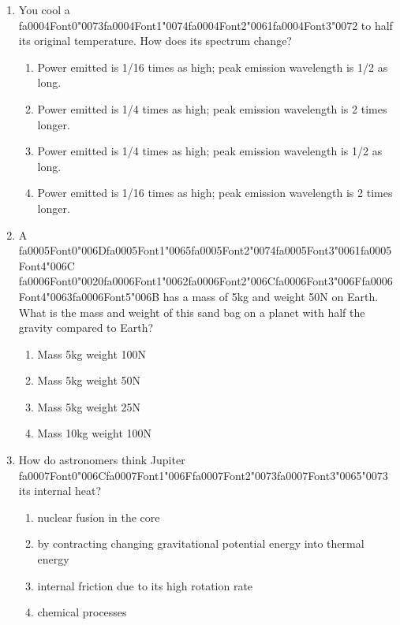 \documentclass[12pt]{article}
\begin{document}
\begin{enumerate}[label=\arabic*.]
\begin{enumerate}[label=(\alph*)]
    \item 2:3 periodic ratio of Neptune:Pluto
    \item Kirkwood Gaps.
    \item Gaps in Saturn's rings.
    \item Breaking of small Jovian moons to form ring materials.
\end{enumerate}
\item You cool a {\csname fa0004Font0\endcsname\char"0073}{\csname fa0004Font1\endcsname\char"0074}{\csname fa0004Font2\endcsname\char"0061}{\csname fa0004Font3\endcsname\char"0072} to half its original temperature. How does its spectrum change?
\begin{enumerate}[label=(\alph*)]
    \item Power emitted is 1/16 times as high; peak emission wavelength is 1/2 as long.
    \item Power emitted is 1/4 times as high; peak emission wavelength is 2 times longer.
    \item Power emitted is 1/4 times as high; peak emission wavelength is 1/2 as long.
    \item Power emitted is 1/16 times as high; peak emission wavelength is 2 times longer.
\end{enumerate}
\item A {\csname fa0005Font0\endcsname\char"006D}{\csname fa0005Font1\endcsname\char"0065}{\csname fa0005Font2\endcsname\char"0074}{\csname fa0005Font3\endcsname\char"0061}{\csname fa0005Font4\endcsname\char"006C} {\csname fa0006Font0\endcsname\char"0020}{\csname fa0006Font1\endcsname\char"0062}{\csname fa0006Font2\endcsname\char"006C}{\csname fa0006Font3\endcsname\char"006F}{\csname fa0006Font4\endcsname\char"0063}{\csname fa0006Font5\endcsname\char"006B} has a mass of 5kg and weight 50N on Earth. What is the mass and weight of this
sand bag on a planet with half the gravity compared to Earth?
\begin{enumerate}[label=(\alph*)]
    \item Mass 5kg weight 100N
    \item Mass 5kg weight 50N
    \item Mass 5kg weight 25N
    \item Mass 10kg weight 100N
\end{enumerate}
\item How do astronomers think Jupiter {\csname fa0007Font0\endcsname\char"006C}{\csname fa0007Font1\endcsname\char"006F}{\csname fa0007Font2\endcsname\char"0073}{\csname fa0007Font3\endcsname\char"0065}{\char"0073} its internal heat?
\begin{enumerate}[label=(\alph*)]
    \item nuclear fusion in the core
    \item by contracting changing gravitational potential energy into thermal energy
    \item internal friction due to its high rotation rate
    \item chemical processes
\end{enumerate}
\end{enumerate}
\end{document}
